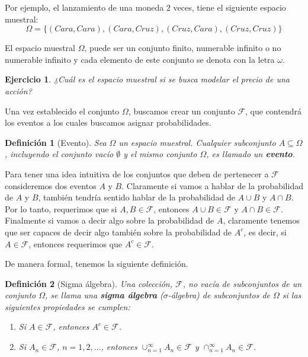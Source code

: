 \documentclass[11pt]{report}
\theoremstyle{break}
\newtheorem{definicion}{Definición}[chapter]
\newtheorem{ejercicio}{Ejercicio}[chapter]
\theoremstyle{break}
\begin{document}
Por ejemplo, el lanzamiento de una moneda $2$ veces, tiene el siguiente espacio muestral:
$$
\Omega = \{\left(Cara,Cara\right), \left(Cara,Cruz\right),\left(Cruz,Cara\right), \left(Cruz,Cruz\right)  \}
$$

El espacio muestral $\Omega$, puede ser un conjunto finito, numerable infinito o no numerable infinito y cada elemento de este conjunto se denota con la letra $\omega$.

\begin{ejercicio}
¿Cuál es  el espacio muestral si se busca modelar el precio de una acción?
\end{ejercicio}

Una vez establecido el conjunto $\Omega$, buscamos crear un conjunto $\mathcal{F}$, que contendrá los eventos a los cuales buscamos asignar probabilidades.

\begin{definicion}[Evento]
Sea $\Omega$ un espacio muestral. Cualquier subconjunto $A \subseteq \Omega$, incluyendo el conjunto vacío $\emptyset$ y el mismo conjunto $\Omega$, es llamado un \textbf{evento}.
\end{definicion}

Para tener una idea intuitiva de los conjuntos que deben de pertenecer a $\mathcal{F}$ consideremos dos eventos $A$ y $B$. Claramente si vamos a hablar de la probabilidad de $A$ y $B$, también tendría sentido hablar de la probabilidad de $A \cup B$ y $A \cap B$. Por lo tanto, requerimos que si $A, B \in \mathcal{F}$, entonces $A \cup B \in \mathcal{F}$ y  $A \cap B \in \mathcal{F}$. Finalmente si vamos a decir algo sobre la probabilidad de $A$, claramente tenemos que ser capaces de decir algo también sobre la probabilidad de $A^{c}$, es decir, si $A \in \mathcal{F}$, entonces requerimos que $A^{c} \in \mathcal{F}$.

De manera formal, tenemos la siguiente definición.

\begin{definicion}[Sigma álgebra]
\label{definicion:sigma algebra}
Una colección, $\mathcal{F}$, no vacía de subconjuntos de un conjunto $\Omega$, se llama una \textbf{sigma álgebra} ($\sigma$-álgebra) de subconjuntos de $\Omega$ si las siguientes propiedades se cumplen:

\begin{enumerate}
\item Si $A \in \mathcal{F}$, entonces $A^{c} \in \mathcal{F}$.

\item Si $A_n \in \mathcal{F}$, $n = 1,2, \ldots$, entonces $\cup_{n=1}^{\infty}A_n \in \mathcal{F}$ y $\cap_{n=1}^{\infty}A_n \in \mathcal{F}$.
\end{enumerate}

\end{definicion}
\end{document}
